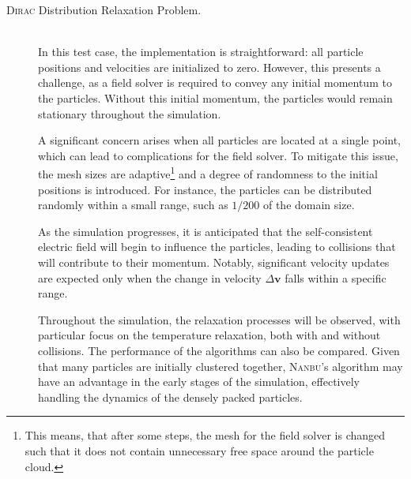 \begin{description}
    \item[\textsc{Dirac} Distribution Relaxation Problem.] \hfill \\
    In this test case, the implementation is straightforward: all particle positions and velocities are initialized to zero. However, this presents a challenge, as a field solver is required to convey any initial momentum to the particles. Without this initial momentum, the particles would remain stationary throughout the simulation.
    
    A significant concern arises when all particles are located at a single point, which can lead to complications for the field solver. To mitigate this issue, the mesh sizes are adaptive\footnote{This means, that after some steps, the mesh for the field solver is changed such that it does not contain unnecessary free space around the particle cloud.} and a degree of randomness to the initial positions is introduced. For instance, the particles can be distributed randomly within a small range, such as $1/200$ of the domain size. 
    
    As the simulation progresses, it is anticipated that the self-consistent electric field will begin to influence the particles, leading to collisions that will contribute to their momentum. Notably, significant velocity updates are expected only when the change in velocity $\Delta \mathbf{v}$ falls within a specific range.

    Throughout the simulation, the relaxation processes will be observed, with particular focus on the temperature relaxation, both with and without collisions. The performance of the algorithms can also be compared. Given that many particles are initially clustered together, \textsc{Nanbu}'s algorithm may have an advantage in the early stages of the simulation, effectively handling the dynamics of the densely packed particles.


\end{description}
